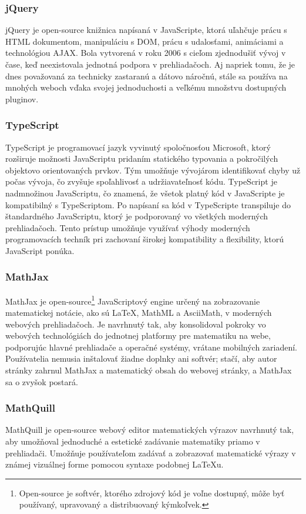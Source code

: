 \subsubsection{jQuery}
jQuery je open-source knižnica napísaná v JavaScripte, ktorá uľahčuje prácu s HTML dokumentom, manipuláciu s DOM, prácu s udalosťami, animáciami a technológiou AJAX.
 Bola vytvorená v roku 2006 s cieľom zjednodušiť vývoj v čase, keď neexistovala jednotná podpora v prehliadačoch.
  Aj napriek tomu, že je dnes považovaná za technicky zastaranú a dátovo náročnú, stále sa používa na mnohých weboch vďaka svojej jednoduchosti a veľkému množstvu dostupných pluginov.\cite{jquery}


 \subsubsection{TypeScript}
TypeScript \cite{TypeScript} je programovací jazyk vyvinutý spoločnosťou Microsoft, ktorý rozširuje možnosti JavaScriptu pridaním statického typovania a pokročilých objektovo orientovaných prvkov.
 Tým umožňuje vývojárom identifikovať chyby už počas vývoja, čo zvyšuje spoľahlivosť a udržiavateľnosť kódu.
  TypeScript je nadmnožinou JavaScriptu, čo znamená, že všetok platný kód v JavaScripte je kompatibilný s TypeScriptom.
   Po napísaní sa kód v TypeScripte transpiluje do štandardného JavaScriptu, ktorý je podporovaný vo všetkých moderných prehliadačoch. 
   Tento prístup umožňuje využívať výhody moderných programovacích techník pri zachovaní širokej kompatibility a flexibility, ktorú JavaScript ponúka.
\subsubsection{MathJax}
MathJax \cite{MathJax} je open-source\footnote{Open-source je softvér, ktorého zdrojový kód je voľne dostupný, môže byť používaný, upravovaný a distribuovaný kýmkoľvek.} JavaScriptový engine určený na zobrazovanie matematickej notácie, ako sú LaTeX, MathML a AsciiMath, v moderných webových prehliadačoch.
Je navrhnutý tak, aby konsolidoval pokroky vo webových technológiách do jednotnej platformy pre matematiku na webe, podporujúc hlavné prehliadače a operačné systémy, vrátane mobilných zariadení.
Používatelia nemusia inštalovať žiadne doplnky ani softvér; stačí, aby autor stránky zahrnul MathJax a matematický obsah do webovej stránky, a MathJax sa o zvyšok postará.


  \subsubsection{MathQuill}
  MathQuill \cite{mathquill} je open-source webový editor matematických výrazov navrhnutý tak, aby umožňoval jednoduché a estetické zadávanie matematiky priamo v prehliadači. 
  Umožňuje používateľom zadávať a zobrazovať matematické výrazy v známej vizuálnej forme pomocou syntaxe podobnej LaTeXu.

